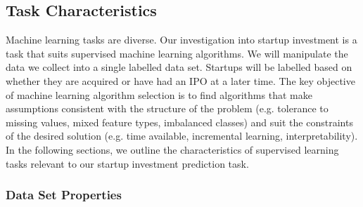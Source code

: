 \documentclass[../thesis/thesis.tex]{subfiles}
\begin{document}

\subsection{Task Characteristics}

Machine learning tasks are diverse. Our investigation into startup investment is a task that suits supervised machine learning algorithms. We will manipulate the data we collect into a single labelled data set. Startups will be labelled based on whether they are acquired or have had an IPO at a later time. The key objective of machine learning algorithm selection is to find algorithms that make assumptions consistent with the structure of the problem (e.g. tolerance to missing values, mixed feature types, imbalanced classes) and suit the constraints of the desired solution (e.g. time available, incremental learning, interpretability). In the following sections, we outline the characteristics of supervised learning tasks relevant to our startup investment prediction task.

\subsubsection{Data Set Properties}
\end{document}
